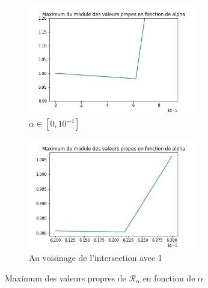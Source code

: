 \documentclass{article}
\begin{document}
\begin{figure}
    \centering
    \begin{subfigure}[b]{0.4\textwidth}
        \centering
        \includegraphics[width=0.8\textwidth, height=0.8\textwidth]{choix_alpha_1D.jpg}
        \caption{$\alpha \in [0, 10^{-4}]$}
    \end{subfigure}
    \hfill
    \begin{subfigure}[b]{0.4\textwidth}
        \centering
        \includegraphics[width=0.8\textwidth, height=0.8\textwidth]{choix_alpha_1D_zoom.jpg}
        \caption{Au voisinage de l'intersection avec 1}
    \end{subfigure}
       \caption{Maximum des valeurs propres de $\mathcal{R}_\alpha$ en fonction de $\alpha$}
       \label{fig:choix alpha 1D}
\end{figure}
\end{document}
